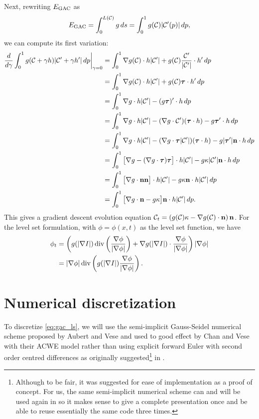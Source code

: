 Next, rewriting $E_\textrm{GAC}$ as 
\begin{align*}
E_\textrm{GAC} = \int^{L(\mathcal{C})}_0 g \, ds 
= \int^1_0 g(\mathcal{C}) \lvert\mathcal{C}'(p)\rvert \, dp ,
\end{align*} 
we can compute its first variation: 
\begin{align*}
\frac{d}{d\gamma} \int^1_0 g(\mathcal{C} + \gamma h) \lvert\mathcal{C}' + \gamma h'\rvert \, dp \bigg\rvert_{\gamma = 0}
&=  \int^1_0 \nabla g(\mathcal{C}) \cdot h \lvert\mathcal{C}'\rvert + g(\mathcal{C}) \frac{\mathcal{C}'}{\lvert\mathcal{C}'\rvert} \cdot h' \,dp 
\\
&=\int^1_0 \nabla g(\mathcal{C}) \cdot h \lvert\mathcal{C}'\rvert + g(\mathcal{C}) \boldsymbol{\tau} \cdot h' \,dp 
\\
&=\int^1_0 \nabla g \cdot h \lvert\mathcal{C}'\rvert - ( g \boldsymbol{\tau})' \cdot h \, dp
\\
&=\int^1_0 \nabla g \cdot h \lvert\mathcal{C}'\rvert - (\nabla g \cdot \mathcal{C}')(\boldsymbol{\tau} \cdot h) - g\boldsymbol{\tau} ' \cdot h \, dp
\\
&=\int^1_0 \nabla g \cdot h \lvert\mathcal{C}'\rvert - (\nabla g \cdot \boldsymbol{\tau} \lvert\mathcal{C}'\rvert )(\boldsymbol{\tau} \cdot h) - g\lvert\boldsymbol{\tau}'\rvert \mathbf{n} \cdot h \, dp
\\
&=\int^1_0 \big[ \nabla g  - (\nabla g \cdot \boldsymbol{\tau} )\boldsymbol{\tau} \big] \cdot h \lvert\mathcal{C}'\rvert - g\kappa \lvert\mathcal{C}'\rvert \mathbf{n} \cdot h \, dp
\\
&=\int^1_0 \big[\nabla g \cdot \mathbf{n} \mathbf{n} \big] \cdot h \lvert\mathcal{C}'\rvert - g\kappa  \mathbf{n} \cdot h \lvert\mathcal{C}'\rvert \, dp
\\
&=\int^1_0 \big[ \nabla g \cdot \mathbf{n} - g\kappa \big] \mathbf{n}  \cdot h \lvert\mathcal{C}'\rvert \, dp.
\\ 
\end{align*}
This gives a gradient descent evolution equation $\mathcal{C}_t = \left( g(\mathcal{C}) \kappa - \nabla g(\mathcal{C}) \cdot \mathbf{n} \right) \mathbf{n} $.
For the level set formulation, with $\phi = \phi(x, t)$ as the level set function, we have 
\begin{align}
\begin{split} 
\phi_t 
&= \left(
g( \lvert\nabla I \rvert ) \operatorname{div}\left( \frac{\nabla \phi}{\lvert\nabla \phi\rvert} \right)
	+  \nabla g(  \lvert\nabla I \rvert )\cdot  \frac{\nabla \phi}{\lvert\nabla \phi\rvert}
\right) \lvert \nabla \phi \rvert
\\
&= \lvert\nabla \phi\rvert \operatorname{div}\left( 
g(  \lvert\nabla I \rvert ) \frac{\nabla \phi}{\lvert\nabla \phi\rvert}
\right) .
\end{split}
\label{eq:gac_ls}
\end{align}

\section{Numerical discretization}
To discretize \eqref{eq:gac_ls}, we will use the semi-implicit Gauss-Seidel  numerical scheme proposed by Aubert and Vese \cite{aubert1997variational} and used to good effect by Chan and Vese with their ACWE model \cite{chan2001active} rather than using explicit forward Euler with second order centred differences as originally suggested\footnote{Although to be fair, it was suggested for ease of implementation as a proof of concept. For us, the same semi-implicit numerical scheme can and will be used again in  so it makes sense to give a complete presentation once and be able to reuse essentially the same code three times. } in \cite{caselles1997geodesic}.

